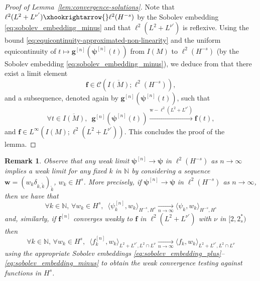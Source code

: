 \documentclass[12pt,a4paper]{amsart}
\newtheorem{remark}[theorem]{Remark}
\numberwithin{equation}{section}
\newcommand{\ulg}{\boldsymbol{g}}
\newcommand{\ulpsi}{\boldsymbol{\psi}}
\newcommand{\ulf}{\boldsymbol{f}}
\newcommand{\ulw}{\boldsymbol{w}}
\begin{document}
\begin{proof}[Proof of Lemma~\ref{lem:convergence-solutions}]
		Note that $\ell^2(L^2+ L^{\nu'}) \xhookrightarrow{} \ell^2(H^{-s})$ by the Sobolev embedding \eqref{eq:sobolev_embedding_minus} and that $  \ell^2(L^2+ L^{\nu'})  $ is reflexive. Using the bound \eqref{eq:equicontinuity-approximated-non-linearity} and the uniform equicontinuity of $t \mapsto \ulg^{[n]}(\ulpsi^{[n]}(t))$ from $I(M)$ to $ \ell^2(H^{-s})$ (by the Sobolev embedding \eqref{eq:sobolev_embedding_minus}), we deduce from \cite[Proposition 1.1.2]{cazenave2003semilinear} that there exist a limit element 
		\begin{equation}
			\ulf \in \mathscr{C}(\overline{I(M)}; \ell^2(H^{-s})) ,
		\end{equation}
		and a subsequence, denoted again by $ \ulg^{[n]}(\ulpsi^{[n]}(t)) $, such that
		\begin{equation}
			\forall t \in \overline{I(M)}, \;\  \ulg^{[n]}(\ulpsi^{[n]}(t)) \xrightarrow{\mathrm{w}-\ell^2(L^2+ L^{\nu'})} \ulf(t) ,
		\end{equation}
		and $ \ulf \in L^\infty( I(M) ; \ell^2(L^2+ L^{\nu'}) )$. This concludes the proof of the lemma. 
	\end{proof}
	
	
	\begin{remark}\label{rmk:weak_convergence_ellp}
		Observe that any weak limit $\ulpsi^{[n]} \to \ulpsi$ in $ \ell^2(H^{-s}) $ as $n\to\infty$ implies a weak limit for any fixed $k$ in $\mathbb{N} $ by considering a sequence $ \ulw = (w_{k}  \delta_{k,\tilde{k}})_{\tilde{k}} $, $ w_k \in H^s $. More precisely, if $\ulpsi^{[n]} \to \ulpsi$ in $ \ell^2(H^{-s}) $ as $n\to\infty$, then we have that 
		\begin{equation}
			\forall k \in \mathbb{N} , \, \forall w_k \in H^{s}, \;\ \langle \psi^{[n]}_{k} , w_k \rangle_{H^{-s},H^s} \xrightarrow[n\to\infty]{} \langle \psi_k , w_k \rangle_{H^{-s},H^s} 
		\end{equation} 
		and, similarly, if $\ulf^{[n]}$ converges weakly to $\ulf$ in $ \ell^2(L^2+L^{\nu'}) $ with $\nu$ in $[2,2^*_s)$
		then
		\begin{equation}
			\forall k \in \mathbb{N}, \, \forall w_k \in H^{s}, \;\ \langle f^{[n]}_{k} , w_k \rangle_{L^2+L^{\nu'},L^2\cap L^\nu} \xrightarrow[n\to\infty]{} \langle f_k , w_k \rangle_{L^2+L^{\nu'},L^2\cap L^\nu} 
		\end{equation} 
		using the appropriate Sobolev embeddings \eqref{eq:sobolev_embedding_plus}--\eqref{eq:sobolev_embedding_minus} to obtain the weak convergence testing against functions in $ H^{s} $.
	\end{remark}
	
\end{document}
